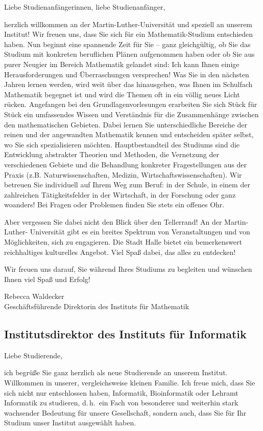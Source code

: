 Liebe Studienanfängerinnen, liebe Studienanfänger,

herzlich willkommen an der Martin-Luther-Universität und speziell an
unserem Institut! Wir freuen uns, dass Sie sich für ein
Mathematik-Studium entschieden haben.
Nun beginnt eine spannende Zeit für Sie -- ganz gleichgültig, ob Sie das
Studium mit konkreten beruflichen Plänen aufgenommen haben oder ob Sie
aus purer Neugier im Bereich Mathematik gelandet sind: Ich kann Ihnen
einige Herausforderungen und Überraschungen versprechen!
Was Sie in den nächsten Jahren lernen werden, wird weit über das
hinausgehen, was Ihnen im Schulfach Mathematik begegnet ist und wird die
Themen oft in ein völlig neues Licht rücken. Angefangen bei den
Grundlagenvorlesungen erarbeiten Sie sich Stück für Stück ein
umfassendes Wissen und Verständnis für die Zusammenhänge zwischen den
mathematischen Gebieten. Dabei lernen Sie unterschiedliche Bereiche der
reinen und der angewandten Mathematik kennen und entscheiden später
selbst, wo Sie sich spezialisieren möchten. Hauptbestandteil des
Studiums sind die Entwicklung abstrakter Theorien und Methoden, die
Vernetzung der verschiedenen Gebiete und die Behandlung konkreter
Fragestellungen aus der Praxis (z.B. Naturwissenschaften, Medizin,
Wirtschaftswissenschaften).
Wir betreuen Sie individuell auf Ihrem Weg zum Beruf: in der
Schule, in einem der zahlreichen Tätigkeitsfelder in der Wirtschaft,
in der Forschung oder ganz woanders! Bei Fragen oder Problemen finden Sie stets ein offenes
Ohr.

Aber vergessen Sie dabei nicht den Blick über den Tellerrand! An der
Martin-Luther- Universität gibt es ein breites Spektrum von
Veranstaltungen und von Möglichkeiten, sich zu engagieren. Die Stadt
Halle bietet ein bemerkenswert reichhaltiges kulturelles Angebot. Viel
Spaß dabei, das alles zu entdecken! 

Wir freuen uns darauf, Sie während Ihres Studiums zu begleiten und
wünschen Ihnen viel Spaß und Erfolg!
 
Rebecca Waldecker \\
Geschäftsführende Direktorin des Instituts für Mathematik

\newpage

\subsection*{Institutsdirektor des Instituts für Informatik}

Liebe Studierende,

ich begrüße Sie ganz herzlich als neue Studierende an unserem Institut.
Willkommen in unserer, vergleichsweise kleinen Familie. Ich freue mich, dass Sie
sich nicht nur entschlossen haben, Informatik, Bioinformatik oder Lehramt
Informatik zu studieren, d.\,h.\ ein Fach von  besonderer und weiterhin stark
wachsender Bedeutung für unsere Gesellschaft, sondern auch, dass Sie für Ihr
Studium unser Institut ausgewählt haben.

